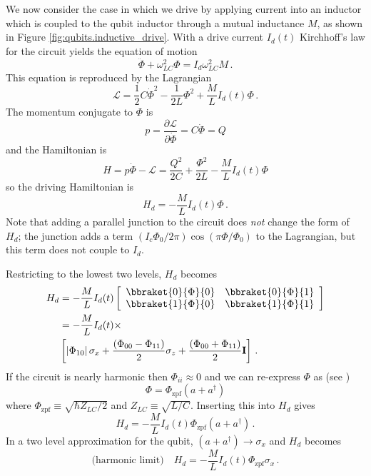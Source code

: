 We now consider the case in which we drive by applying current into an inductor which is coupled to the qubit inductor through a mutual inductance $M$, as shown in Figure \ref{fig:qubits.inductive_drive}.
With a drive current $I_d(t)$ Kirchhoff's law for the circuit yields the equation of motion
\begin{equation}
\ddot{\Phi} + \omega_{LC}^2 \Phi = I_d \omega_{LC}^2 M \, .
\end{equation}
This equation is reproduced by the Lagrangian
\begin{equation}
\mathcal{L} = \frac{1}{2}C \dot{\Phi}^2 - \frac{1}{2L} \Phi^2 + \frac{M}{L}I_d(t) \Phi \, .
\end{equation}
The momentum conjugate to $\Phi$ is
\begin{equation}
p = \frac{\partial \mathcal{L}}{\partial \dot{\Phi}} = C \dot{\Phi} = Q
\end{equation}
and the Hamiltonian is
\begin{equation}
H = p \dot{\Phi} - \mathcal{L} = \frac{Q^2}{2C} + \frac{\Phi^2}{2L} - \frac{M}{L} I_d(t) \Phi
\end{equation}
so the driving Hamiltonian is
\begin{equation}
H_d = - \frac{M}{L}I_d(t) \Phi \, .
\end{equation}
Note that adding a parallel junction to the circuit does \emph{not} change the form of $H_d$; the junction adds a term $(I_c \Phi_0 / 2\pi)\cos(\pi \Phi / \Phi_0)$ to the Lagrangian, but this term does not couple to $I_d$.

Restricting to the lowest two levels, $H_d$ becomes
\begin{align}
  H_d
  &= - \frac{M}{L} I_d(t)
  \left[ \begin{array}{cc}
    \bbraket{0}{\Phi}{0} & \bbraket{0}{\Phi}{1} \\
    \bbraket{1}{\Phi}{0} & \bbraket{1}{\Phi}{1} 
  \end{array} \right] \\
  &= - \frac{M}{L} I_d(t) \times \nonumber \\
  &\left[
    \left| \Phi_{10} \right| \sigma_x
    + \frac{(\Phi_{00} - \Phi_{11})}{2} \sigma_z
    + \frac{(\Phi_{00} + \Phi_{11})}{2} \mathbf{I}
  \right] \, .
\end{align}
If the circuit is nearly harmonic then $\Phi_{ii} \approx 0$ and we can re-express $\Phi$ as (see \citeinternaltype {})
\begin{equation}
\Phi = \Phi_{\text{zpf}} \left( a + a^\dagger \right)
\end{equation}
where $\Phi_{\text{zpf}} \equiv \sqrt{\hbar Z_{LC} / 2}$ and $Z_{LC} \equiv \sqrt{L/C}$.
Inserting this into $H_d$ gives
\begin{equation}
H_d = -\frac{M}{L} I_d(t) \Phi_{\text{zpf}} (a + a^\dagger) \, .
\end{equation}
In a two level approximation for the qubit, $(a + a^\dagger)\rightarrow \sigma_x$ and $H_d$ becomes
\begin{equation}
\text{(harmonic limit)} \quad H_d = - \frac{M}{L} I_d(t) \Phi_{\text{zpf}} \sigma_x \, .
\end{equation}
